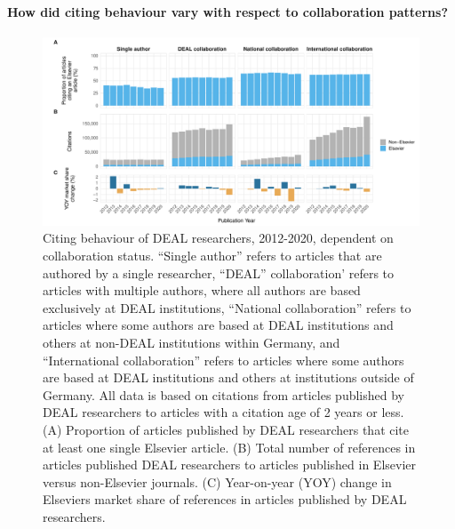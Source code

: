 \documentclass[
]{article}
\begin{document}
\hypertarget{how-did-citing-behaviour-vary-with-respect-to-collaboration-patterns}{%
\paragraph{How did citing behaviour vary with respect to collaboration patterns?}\label{how-did-citing-behaviour-vary-with-respect-to-collaboration-patterns}}



\begin{figure}

{\centering \includegraphics{analysis_files/figure-latex/references-publisher-year-collaboration-1} 

}

\caption{Citing behaviour of DEAL researchers, 2012-2020, dependent on collaboration status. ``Single author'' refers to articles that are authored by a single researcher, ``DEAL'' collaboration' refers to articles with multiple authors, where all authors are based exclusively at DEAL institutions, ``National collaboration'' refers to articles where some authors are based at DEAL institutions and others at non-DEAL institutions within Germany, and ``International collaboration'' refers to articles where some authors are based at DEAL institutions and others at institutions outside of Germany. All data is based on citations from articles published by DEAL researchers to articles with a citation age of 2 years or less. (A) Proportion of articles published by DEAL researchers that cite at least one single Elsevier article. (B) Total number of references in articles published DEAL researchers to articles published in Elsevier versus non-Elsevier journals. (C) Year-on-year (YOY) change in Elsevier\textquotesingle s market share of references in articles published by DEAL researchers.}\label{fig:references-publisher-year-collaboration}
\end{figure}
\end{document}

